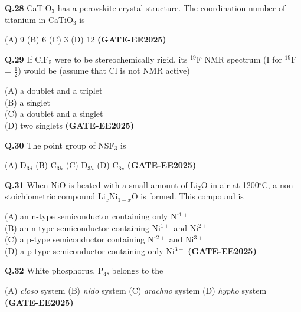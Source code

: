 \documentclass[12pt]{article}
\begin{document}
\begin{enumerate}
\vspace{0.5cm}

\textbf{Q.28} CaTiO$_3$ has a perovskite crystal structure. The coordination number of titanium in CaTiO$_3$ is

(A) 9 \hspace{1cm}
(B) 6 \hspace{1cm}
(C) 3 \hspace{1cm}
(D) 12   \textbf{(GATE-EE2025)}


\vspace{0.5cm}

\textbf{Q.29} If ClF$_5$ were to be stereochemically rigid, its $^{19}$F NMR spectrum (I for $^{19}$F = $\frac{1}{2}$) would be (assume that Cl is not NMR active)

(A) a doublet and a triplet\\
(B) a singlet\\
(C) a doublet and a singlet\\
(D) two singlets   \textbf{(GATE-EE2025)}


\vspace{0.5cm}

\textbf{Q.30} The point group of NSF$_3$ is

(A) D$_{3d}$ \hspace{1cm}
(B) C$_{3h}$ \hspace{1cm}
(C) D$_{3h}$ \hspace{1cm}
(D) C$_{3v}$   \textbf{(GATE-EE2025)}


\textbf{Q.31} When NiO is heated with a small amount of Li$_2$O in air at 1200$^\circ$C, a non-stoichiometric compound Li$_x$Ni$_{1-x}$O is formed. This compound is

(A) an n-type semiconductor containing only Ni$^{1+}$\\
(B) an n-type semiconductor containing Ni$^{1+}$ and Ni$^{2+}$\\
(C) a p-type semiconductor containing Ni$^{2+}$ and Ni$^{3+}$\\
(D) a p-type semiconductor containing only Ni$^{3+}$   \textbf{(GATE-EE2025)}


\vspace{0.5cm}

\textbf{Q.32} White phosphorus, P$_4$, belongs to the

(A) \textit{closo} system \hspace{1cm}
(B) \textit{nido} system \hspace{1cm}
(C) \textit{arachno} system \hspace{1cm}
(D) \textit{hypho} system   \textbf{(GATE-EE2025)}



\end{enumerate}
\end{document}
